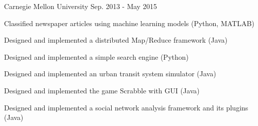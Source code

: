 

\begin{cventries}

  \cvsimpleentry
    {} %
    {Carnegie Mellon University} %
    {} %
    {Sep. 2013 - May 2015} %
     {
      \begin{cvitems} %
        \item {Classified newspaper articles using machine learning models (Python, MATLAB)}
        \item {Designed and implemented a distributed Map/Reduce framework (Java)}
        \item {Designed and implemented a simple search engine (Python)}
        \item {Designed and implemented an urban transit system simulator (Java)}
        \item {Designed and implemented the game Scrabble with GUI (Java)}
        \item {Designed and implemented a social network analysis framework and its plugins (Java)}
      \end{cvitems}
    }


\end{cventries}
